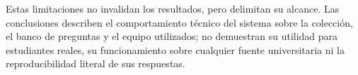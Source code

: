 Estas limitaciones no invalidan los resultados, pero
delimitan su alcance. Las conclusiones describen el comportamiento técnico del
sistema sobre la colección, el banco de preguntas y el equipo utilizados; no
demuestran su utilidad para estudiantes reales, su funcionamiento sobre
cualquier fuente universitaria ni la reproducibilidad literal de sus
respuestas.

